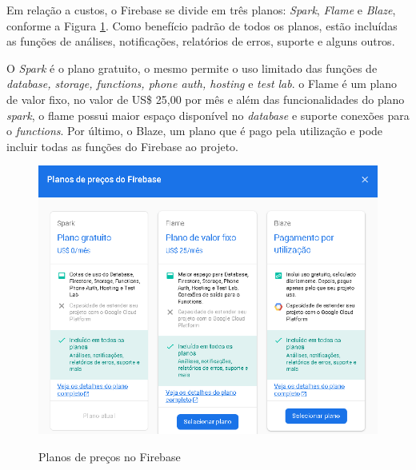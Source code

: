 Em relação a custos, o Firebase se divide em três planos: \textit{Spark}, \textit{Flame} e \textit{Blaze}, conforme a Figura \ref{fig:firebase_precos}. Como benefício padrão de todos os planos, estão incluídas as funções de análises, notificações, relatórios de erros, suporte e alguns outros.

O \textit{Spark} é o plano gratuito, o mesmo permite o uso limitado das funções de \textit{database, storage, functions, phone auth, hosting} e \textit{test lab}. o Flame é um plano de valor fixo, no valor de US\$ 25,00 por mês e além das funcionalidades do plano \textit{spark}, o flame possui maior espaço disponível no \textit{database} e suporte conexões para o \textit{functions}. Por último, o Blaze, um plano que é pago pela utilização e pode incluir todas as funções do Firebase ao projeto.

\begin{figure}[htb]
    \caption{Planos de preços no Firebase}
    \centering
    \begin{frame}{
    \includegraphics [scale = 0.825]{img/firebase_precos.PNG} }
    \end{frame}
    \label{fig:firebase_precos}
\end{figure}